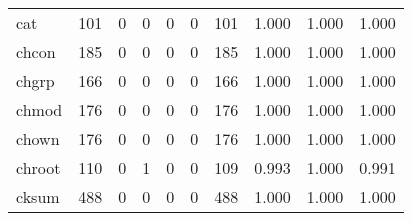 \begin{longtable}{lp{2.0cm}p{2.0cm}p{2.0cm}p{2.0cm}p{2.0cm}p{2.0cm}p{2.0cm}p{2.0cm}p{2.0cm}}
cat       &                    101 &                                             0 &                                            0 &                                           0 &                                            0 &                                        101 &                                1.000 &                                  1.000 &                                1.000 \\
chcon     &                    185 &                                             0 &                                            0 &                                           0 &                                            0 &                                        185 &                                1.000 &                                  1.000 &                                1.000 \\
chgrp     &                    166 &                                             0 &                                            0 &                                           0 &                                            0 &                                        166 &                                1.000 &                                  1.000 &                                1.000 \\
chmod     &                    176 &                                             0 &                                            0 &                                           0 &                                            0 &                                        176 &                                1.000 &                                  1.000 &                                1.000 \\
chown     &                    176 &                                             0 &                                            0 &                                           0 &                                            0 &                                        176 &                                1.000 &                                  1.000 &                                1.000 \\
chroot    &                    110 &                                             0 &                                            1 &                                           0 &                                            0 &                                        109 &                                0.993 &                                  1.000 &                                0.991 \\
cksum     &                    488 &                                             0 &                                            0 &                                           0 &                                            0 &                                        488 &                                1.000 &                                  1.000 &                                1.000 \\

\end{longtable}
